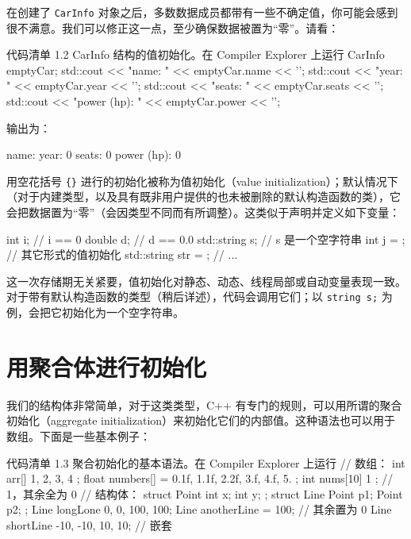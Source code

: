 在创建了 \texttt{CarInfo} 对象之后，多数数据成员都带有一些不确定值，你可能会感到很不满意。我们可以修正这一点，至少确保数据被置为“零”。请看：

\begin{codeboxt}[cpp]{代码清单 1.2 CarInfo 结构的值初始化。在 Compiler Explorer 上运行}
CarInfo emptyCar{};
std::cout << "name: " << emptyCar.name << '\n';
std::cout << "year: " << emptyCar.year << '\n';
std::cout << "seats: " << emptyCar.seats << '\n';
std::cout << "power (hp): " << emptyCar.power << '\n';
\end{codeboxt}

输出为：

\begin{codebox}[cpp]
name:
year: 0
seats: 0
power (hp): 0
\end{codebox}

用空花括号 \texttt{\{\}} 进行的初始化被称为值初始化（value initialization）；默认情况下（对于内建类型，以及具有既非用户提供的也未被删除的默认构造函数的类），它会把数据置为“零”（会因类型不同而有所调整）。这类似于声明并定义如下变量：


\begin{codebox}[cpp]
int i{};
// i == 0
double d{};
// d == 0.0
std::string s{}; // s 是一个空字符串
int j = {}; // 其它形式的值初始化
std::string str = {}; // ...
\end{codebox}

这一次存储期无关紧要，值初始化对静态、动态、线程局部或自动变量表现一致。对于带有默认构造函数的类型（稍后详述），代码会调用它们；以 \texttt{string s;} 为例，会把它初始化为一个空字符串。

\section{用聚合体进行初始化}

我们的结构体非常简单，对于这类类型，C++ 有专门的规则，可以用所谓的聚合初始化（aggregate initialization）来初始化它们的内部值。这种语法也可以用于数组。下面是一些基本例子：

\begin{codeboxt}[cpp]{代码清单 1.3 聚合初始化的基本语法。在 Compiler Explorer 上运行}
// 数组：
int arr[] { 1, 2, 3, 4 };
float numbers[] = { 0.1f, 1.1f, 2.2f, 3.f, 4.f, 5. };
int nums[10] { 1 }; // 1，其余全为 0
// 结构体：
struct Point { int x; int y; };
struct Line { Point p1; Point p2; };
Line longLone {0, 0, 100, 100};
Line anotherLine = {100}; // 其余置为 0
Line shortLine {{-10, -10}, {10, 10}}; // 嵌套
\end{codeboxt}

